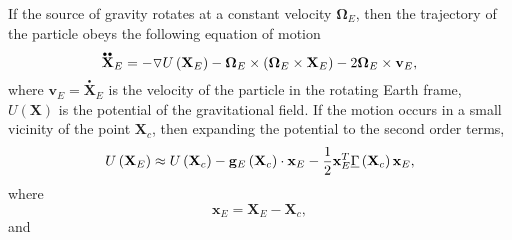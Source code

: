 \documentclass[twocolumn,showpacs,preprintnumbers]{revtex4}
\begin{document}
If the source of gravity rotates at a constant velocity $\mathbf{\Omega }%
_{E} $, then the trajectory of the particle obeys the following equation of
motion 
\begin{equation}
\overset{_{\bullet \bullet }}{\mathbf{X}}_{E}=-\mathbf{\triangledown }%
U\left( \mathbf{X}_{E}\right) -\mathbf{\Omega }_{E}\times \left( \mathbf{%
\Omega }_{E}\times \mathbf{X}_{E}\right) -2\mathbf{\Omega }_{E}\times 
\mathbf{v}_{E},  \label{11}
\end{equation}%
where $\mathbf{v}_{E}=\overset{_{\bullet }}{\mathbf{X}}_{E}$ is the velocity
of the particle in the rotating Earth frame, $U\left( \mathbf{X}\right) $ is
the potential of the gravitational field. If the motion occurs in a small
vicinity of the point $\mathbf{X}_{c}$, then expanding the potential to the
second order terms,%
\begin{equation}
U\left( \mathbf{X}_{E}\right) \approx U\left( \mathbf{X}_{c}\right) -\mathbf{%
g}_{E}\left( \mathbf{X}_{c}\right) \cdot \mathbf{x}_{E}-\dfrac{1}{2}\mathbf{x%
}_{E}^{T}\underline{\Gamma }\left( \mathbf{X}_{c}\right) \mathbf{x}_{E},
\label{12}
\end{equation}%
where%
\begin{equation}
\mathbf{x}_{E}=\mathbf{X}_{E}-\mathbf{X}_{c},  \label{13}
\end{equation}%
and
\end{document}
